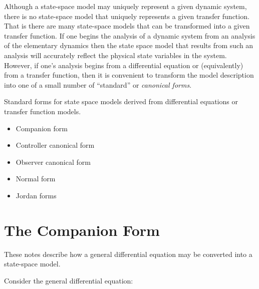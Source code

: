 \def\FileDate{98/10/14}
\def\FileVersion{1.0}

Although a state-space model may uniquely represent a given
dynamic system, there is no state-space model that uniquely
represents a given transfer function. That is there are many
state-space models that can be transformed into a given transfer
function. If one begins the analysis of a dynamic system from an
analysis of the elementary dynamics then the state space model
that results from such an analysis will accurately reflect the
physical state variables in the system. However, if one's analysis
begins from a differential equation or (equivalently) from a
transfer function, then it is convenient to transform the model
description into one of a small number of ``standard'' or
\emph{canonical forms}.

\begin{slide}
	Standard forms for state space models derived from differential equations or transfer function models.
	\begin{itemize}
		\item Companion form
		\item Controller canonical form
		\item Observer canonical form
		\item Normal form
		\item Jordan forms
	\end{itemize}
\end{slide}



\section*{The Companion Form}
These notes describe how a general differential equation may be
converted into a state-space model.

Consider the general differential equation:

